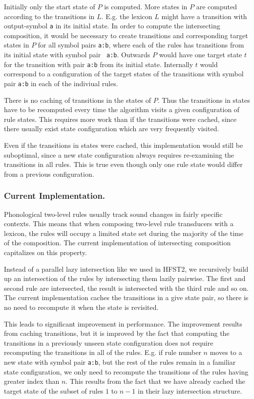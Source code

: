 \documentclass{llncs}
\begin{document}
Initially only the start state of $P$ is computed. More states in $P$
are computed according to the transitions in $L$. E.g. the lexicon $L$
might have a transition with output-symbol {\tt a} in its initial
state. In order to compute the intersecting composition, it would be
necessary to create transitions and corresponding target states in $P$
for all symbol pairs {\tt a:b}, where each of the rules has
transitions from its initial state with symbol pair {\tt
  a:b}. Outwards $P$ would have one target state $t$ for the
transition with pair {\tt a:b} from its initial state. Internally $t$
would correspond to a configuration of the target states of the
transitions with symbol pair {\tt a:b} in each of the indiviual rules.

There is no caching of transitions in the states of $P$. Thus the
transitions in states have to be recomputed every time the algorithm
visits a given configuration of rule states. This requires more work
than if the transitions were cached, since there usually exist state
configuration which are very frequently visited.

Even if the transitions in states were cached, this implementation
would still be suboptimal, since a new state configuration always
requires re-examining the transitions in all rules. This is true even
though only one rule state would differ from a previous configuration.

\subsubsection{Current Implementation.}

Phonological two-level rules usually track sound changes in fairly
specific contexts. This means that when composing two-level rule
transducers with a lexicon, the rules will occupy a limited state set
during the majority of the time of the composition. The current
implementation of intersecting composition capitalizes on this
property.

Instead of a parallel lazy intersection like we used in HFST2, we
recursively build up an intersection of the rules by intersecting them
lazily pairwise. The first and second rule are intersected, the result
is intersected with the third rule and so on. The current
implementation caches the transitions in a give state pair, so there
is no need to recompute it when the state is revisited.

This leads to significant improvement in performance. The improvement
results from caching transitions, but it is improved by the fact that
computing the transitions in a previously unseen state configuration
does not require recomputing the transitions in all of the
rules. E.g. if rule number $n$ moves to a new state with symbol pair
{\tt a:b}, but the rest of the rules remain in a familiar state
configuration, we only need to recompute the transitions of the rules
having greater index than $n$. This results from the fact that we have
already cached the target state of the subset of rules $1$ to $n-1$ in
their lazy intersection structure.
\end{document}
